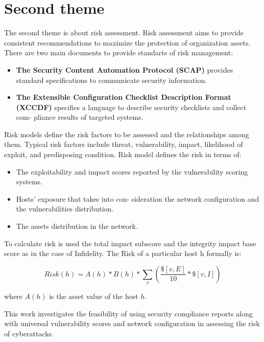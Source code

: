 \documentclass[10pt,a4paper]{article}
\begin{document}
\newpage


\section{Second theme}

The second theme is about risk assessment. Risk assessment aims to provide consistent recommendations to maximize the protection of organization assets. There are two main documents to provide standarts of risk management:
\begin{itemize}
	\item \textbf{The Security Content Automation Protocol (SCAP)} provides standard specifications to communicate security information. 
	\item \textbf{The Extensible Configuration Checklist Description Format (XCCDF)} specifies a language to describe security checklists and collect com- pliance results of targeted systems.
\end{itemize}

Risk models define the risk factors to be assessed and the relationships among them. Typical risk factors include threat, vulnerability, impact, likelihood of exploit, and predisposing condition. Risk model defines the risk in terms of: 
 
\begin{itemize}
	\item The exploitability and impact scores reported by the vulnerability scoring systems.
	\item Hosts’ exposure that takes into con- sideration the network configuration and the vulnerabilities distribution. 
	\item The assets distribution in the network. 
\end{itemize} 
 
To calculate risk is used the total impact subscore and the integrity impact base score as in the case of Infidelity. The Risk of a particular host h formally is:

\begin{equation}
Risk(h) = A(h) * B(h) * \sum_v (\frac{\$[v, E]}{10} * \$[v, I])
\end{equation}
 
where $A(h)$ is the asset value of the host $h$.

\bigskip

This work investigates the feasibility of using security compliance reports along with universal vulnerability scores and network configuration in assessing the risk of cyberattacks.
 
\end{document}
